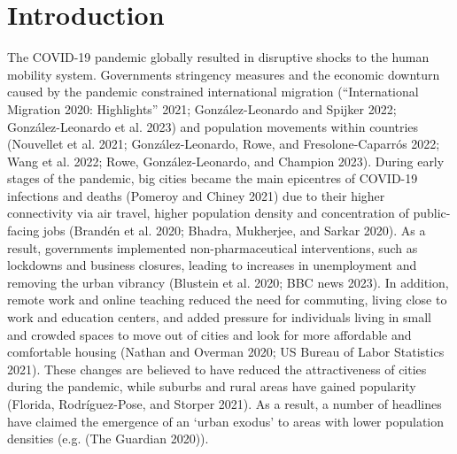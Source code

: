 \documentclass[11pt,letterpaper]{article}
\begin{document}
\pagebreak

\section{Introduction}

The COVID-19 pandemic globally resulted in disruptive shocks to the
human mobility system. Governments stringency measures and the economic
downturn caused by the pandemic constrained international migration
({``International Migration 2020: Highlights''} 2021; González-Leonardo
and Spijker 2022; González-Leonardo et al. 2023) and population
movements within countries (Nouvellet et al. 2021; González-Leonardo,
Rowe, and Fresolone-Caparrós 2022; Wang et al. 2022; Rowe,
González-Leonardo, and Champion 2023). During early stages of the
pandemic, big cities became the main epicentres of COVID-19 infections
and deaths (Pomeroy and Chiney 2021) due to their higher connectivity
via air travel, higher population density and concentration of
public-facing jobs (Brandén et al. 2020; Bhadra, Mukherjee, and Sarkar
2020). As a result, governments implemented non-pharmaceutical
interventions, such as lockdowns and business closures, leading to
increases in unemployment and removing the urban vibrancy (Blustein et
al. 2020; BBC news 2023). In addition, remote work and online teaching
reduced the need for commuting, living close to work and education
centers, and added pressure for individuals living in small and crowded
spaces to move out of cities and look for more affordable and
comfortable housing (Nathan and Overman 2020; US Bureau of Labor
Statistics 2021). These changes are believed to have reduced the
attractiveness of cities during the pandemic, while suburbs and rural
areas have gained popularity (Florida, Rodríguez-Pose, and Storper
2021). As a result, a number of headlines have claimed the emergence of
an `urban exodus' to areas with lower population densities (e.g. (The
Guardian 2020)).
\end{document}
